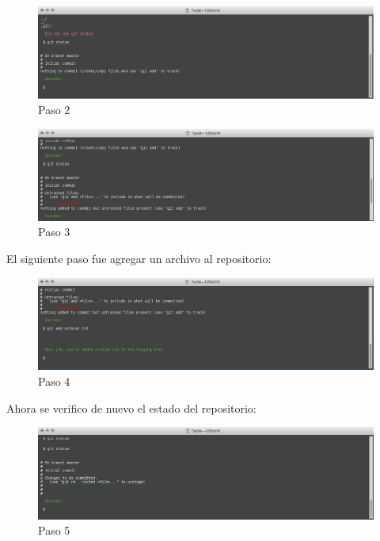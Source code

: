 \documentclass[11pt]{article}
\begin{document}
\begin{figure}[H]
\centering
\includegraphics[scale=0.8]{img/2.png}
\caption{Paso 2}
\label{fig:2}
\end{figure}



\begin{figure}[H]
\centering
\includegraphics[scale=0.8]{img/3.png}
\caption{Paso 3}
\label{fig:3}
\end{figure}

El siguiente paso fue agregar un archivo al repositorio:


\begin{figure}[H]
\centering
\includegraphics[scale=0.8]{img/4.png}
\caption{Paso 4}
\label{fig:4}
\end{figure}
Ahora se verifico de nuevo el estado del repositorio:



\begin{figure}[H]
\centering
\includegraphics[scale=0.8]{img/5.png}
\caption{Paso 5}
\label{fig:5}
\end{figure}
\end{document}
